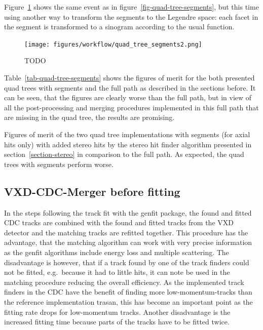 Figure~\ref{fig-quad-tree-hits} shows the same event as in figure~\ref{fig-quad-tree-segments}, but this time using another way to transform the segments to the Legendre space: each facet in the segment is transformed to a sinogram according to the usual function. 

\begin{figure}
  \centering
  \texttt{[image: figures/workflow/quad\_tree\_segments2.png]}
  \caption{TODO}
  \label{fig-quad-tree-hits}
\end{figure}

Table~\ref{tab-quad-tree-segments} shows the figures of merit for the both presented quad trees with segments and the full path as described in the sections before. It can be seen, that the figures are clearly worse than the full path, but in view of all the post-processing and merging procedures implemented in this full path that are missing in the quad tree, the results are promising.

\begin{table}
  \caption{Figures of merit of the two quad tree implementations with segments (for axial hits only) with added stereo hits by the stereo hit finder algorithm presented in section~\ref{section-stereo} in comparison to the full path. As expected, the quad trees with segments perform worse.}
  \label{tab-quad-tree-segments}
\end{table}

\subsection{VXD-CDC-Merger before fitting}
In the steps following the track fit with the genfit package, the found and fitted CDC tracks are combined with the found and fitted tracks from the VXD detector and the matching tracks are refitted together. This procedure has the advantage, that the matching algorithm can work with very precise information as the genfit algorithms include energy loss and multiple scattering. The disadvantage is however, that if a track found by one of the track finders could not be fitted, e.g.\ because it had to little hits, it can note be used in the matching procedure reducing the overall efficiency. As the implemented track finders in the CDC have the benefit of finding more low-momentum-tracks than the reference implementation trasan, this has become an important point as the fitting rate drops for low-momentum tracks. Another disadvantage is the increased fitting time because parts of the tracks have to be fitted twice.

